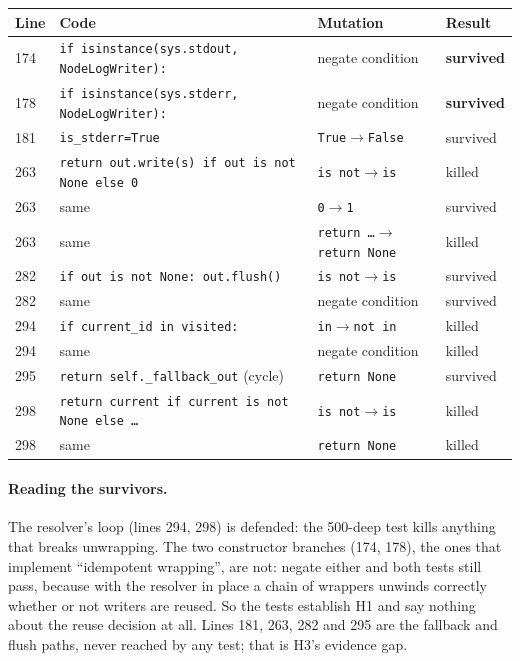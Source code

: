 \documentclass[11pt,a4paper]{article}
\newcommand{\code}[1]{\texttt{#1}}
\begin{document}
\begin{center}\small
\begin{tabularx}{\textwidth}{l X X l}
\toprule
Line & Code & Mutation & Result \\
\midrule
174 & \code{if isinstance(sys.stdout, NodeLogWriter):} & negate condition & \textbf{survived} \\
178 & \code{if isinstance(sys.stderr, NodeLogWriter):} & negate condition & \textbf{survived} \\
181 & \code{is\_stderr=True} & \code{True}$\to$\code{False} & survived \\
263 & \code{return out.write(s) if out is not None else 0} & \code{is not}$\to$\code{is} & killed \\
263 & same & \code{0}$\to$\code{1} & survived \\
263 & same & \code{return \ldots}$\to$\code{return None} & killed \\
282 & \code{if out is not None: out.flush()} & \code{is not}$\to$\code{is} & survived \\
282 & same & negate condition & survived \\
294 & \code{if current\_id in visited:} & \code{in}$\to$\code{not in} & killed \\
294 & same & negate condition & killed \\
295 & \code{return self.\_fallback\_out} (cycle) & \code{return None} & survived \\
298 & \code{return current if current is not None else \ldots} & \code{is not}$\to$\code{is} & killed \\
298 & same & \code{return None} & killed \\
\bottomrule
\end{tabularx}
\end{center}

\paragraph{Reading the survivors.} The resolver's loop (lines 294, 298) is defended: the 500-deep test kills anything that breaks unwrapping. The two constructor branches (174, 178), the ones that implement ``idempotent wrapping'', are not: negate either and both tests still pass, because with the resolver in place a chain of wrappers unwinds correctly whether or not writers are reused. So the tests establish H1 and say nothing about the reuse decision at all. Lines 181, 263, 282 and 295 are the fallback and flush paths, never reached by any test; that is H3's evidence gap.
\end{document}
